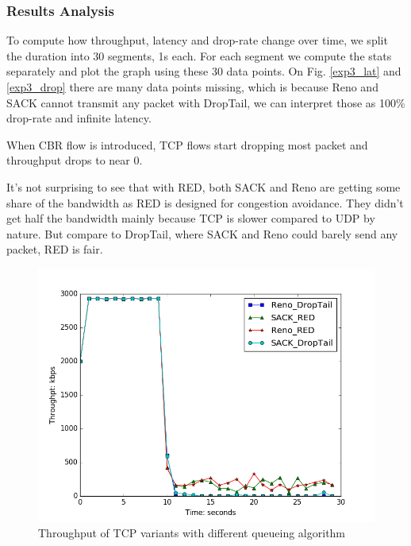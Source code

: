 \documentclass[10pt, conference]{IEEEtran/IEEEtran}
\begin{document}
\subsubsection{Results Analysis}

To compute how throughput, latency and drop-rate change over time, we split the duration into 30 segments, 1s each. For each segment we compute the stats separately and plot the graph using these 30 data points. On Fig. \ref{exp3_lat} and \ref{exp3_drop} there are many data points missing, which is because Reno and SACK cannot transmit any packet with DropTail, we can interpret those as 100\% drop-rate and infinite latency.

When CBR flow is introduced, TCP flows start dropping most packet and throughput drops to near 0.

It's not surprising to see that with RED, both SACK and Reno are getting some share of the bandwidth as RED is designed for congestion avoidance. They didn't get half the bandwidth mainly because TCP is slower compared to UDP by nature. But compare to DropTail, where SACK and Reno could barely send any packet, RED is fair.

\begin{figure}[!ht]
\begin{center}
\includegraphics[width=\linewidth]{../exp3/exp3_thpt.png}
\caption{Throughput of TCP variants with different queueing algorithm}
\label{exp3_thpt}
\end{center}
\end{figure}
\end{document}
